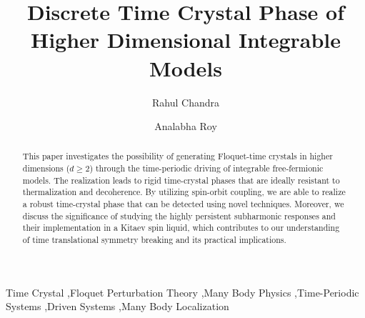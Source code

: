 \documentclass[preprint,5p,times,twocolumn]{elsarticle}
\begin{document}
\begin{frontmatter}

\title{Discrete Time Crystal Phase of Higher Dimensional Integrable Models}

\author[first]{Rahul Chandra}

\author[first]{Analabha Roy}


\begin{abstract}
This paper investigates the possibility of generating Floquet-time crystals in higher dimensions ($d\geq 2$) through the time-periodic driving of integrable free-fermionic models. The realization leads to rigid time-crystal phases that are ideally resistant to thermalization and decoherence.
By utilizing spin-orbit coupling, we are able to realize a robust time-crystal phase that can be detected using novel techniques. Moreover, we discuss the significance of studying the highly persistent subharmonic responses and their implementation in a Kitaev spin liquid, which contributes to our understanding of time translational symmetry breaking and its practical implications.
\end{abstract}

\begin{keyword}
    Time Crystal \sep Floquet Perturbation Theory \sep Many Body Physics \sep Time-Periodic Systems \sep Driven Systems \sep Many Body Localization
    
\end{keyword}
    
\end{frontmatter}
\end{document}
